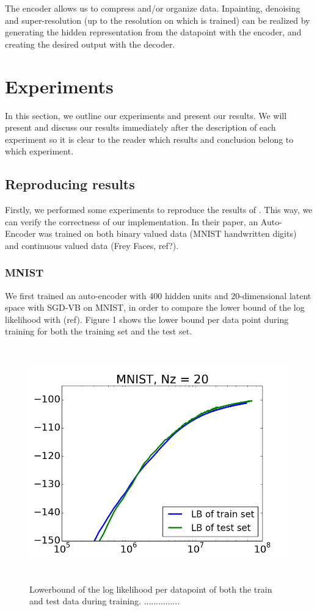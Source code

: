 \documentclass{article}
\begin{document}
The encoder allows us to compress and/or organize data. Inpainting, denoising and super-resolution (up to the resolution on which is trained) can be realized by generating the hidden representation from the datapoint with the encoder, and creating the desired output with the decoder.

\section{Experiments}

In this section, we outline our experiments and present our results. We will present and discuss our results immediately after the description of each experiment so it is clear to the reader which results and conclusion belong to which experiment.

\subsection{Reproducing results}

Firstly, we performed some experiments to reproduce the results of \cite{kingma2013auto}. This way, we can verify the correctness of our implementation. In their paper, an Auto-Encoder was trained on both binary valued data (MNIST handwritten digits) and continuous valued data (Frey Faces, ref?).

\subsubsection{MNIST}

We first trained an auto-encoder with 400 hidden units and 20-dimensional latent space with SGD-VB on MNIST, in order to compare the lower bound of the log likelihood with (ref). Figure 1 shows the lower bound per data point during training for both the training set and the test set.  \\ 

\begin{figure}[htb]
\begin{center}
\includegraphics[height=4in,width=5in]{lowerboundAEVBMNIST.png}
\caption{Lowerbound of the log likelihood per datapoint of both the train and test data during training. ...............}
\end{center}
\end{figure}
\end{document}
